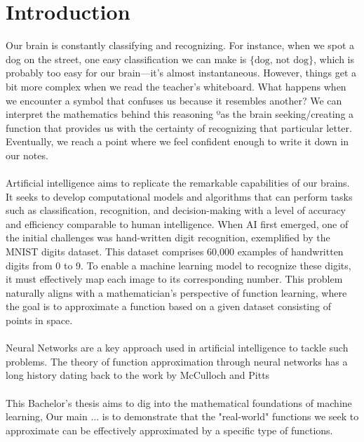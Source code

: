 \documentclass[../main.tex]{subfiles}
\begin{document}
    \chapter{Introduction} \label{ch:intro}
    


\noindent Our brain is constantly classifying and recognizing. For instance, when we spot a dog on the street, one easy classification we can make is  $\{ \text{dog, not dog} \}$, which is probably too easy for our brain—it's almost instantaneous.  However, things get a bit more complex when we read the teacher's whiteboard. What happens when we encounter a symbol that confuses us because it resembles another?
We can interpret the mathematics behind this reasoning ºas the brain seeking/creating a function that provides us with the certainty of recognizing that particular letter. Eventually, we reach a point where we feel confident enough to write it down in our notes. \\ \\
Artificial intelligence aims to replicate the remarkable capabilities of our brains. It seeks to develop computational models and algorithms that can perform tasks such as classification, recognition, and decision-making with a level of accuracy and efficiency comparable to human intelligence. When AI first emerged, one of the initial challenges was hand-written digit recognition, exemplified by the MNIST digits dataset. This dataset comprises 60,000 examples of handwritten digits from 0 to 9. To enable a machine learning model to recognize these digits, it must effectively map each image to its corresponding number.
This problem naturally aligns with a mathematician's perspective of function learning, where the goal is to approximate a function based on a given dataset consisting of points in space.
\\ \\ 
Neural Networks are a key approach used in artificial intelligence to tackle such problems.  The theory of function approximation through neural networks has a long history dating back to the work by McCulloch and Pitts \\ \\
This Bachelor's thesis aims to dig into the mathematical foundations of machine learning, 
Our main ... is to demonstrate that the "real-world" functions we seek to approximate can be effectively approximated by a specific type of functions. \\ \\ 
\end{document}
